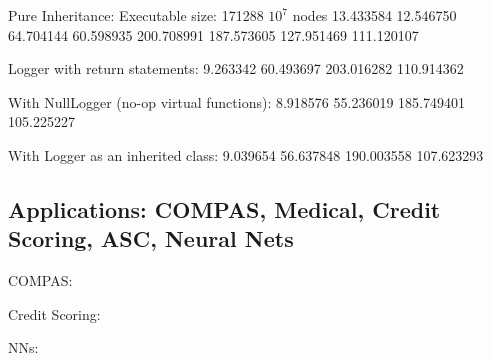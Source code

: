 \documentclass[]{article}
\theoremstyle{definition}
\begin{document}
Pure Inheritance:
Executable size: 171288
$10^7$ nodes
13.433584 12.546750
64.704144 60.598935
200.708991 187.573605
127.951469 111.120107

Logger with return statements:
9.263342
60.493697
203.016282
110.914362

With NullLogger (no-op virtual functions):
8.918576
55.236019
185.749401
105.225227

With Logger as an inherited class:
9.039654
56.637848
190.003558
107.623293


\subsection{Applications: COMPAS, Medical, Credit Scoring, ASC, Neural Nets}

COMPAS:

Credit Scoring:

NNs:

\printbibliography
\end{document}
